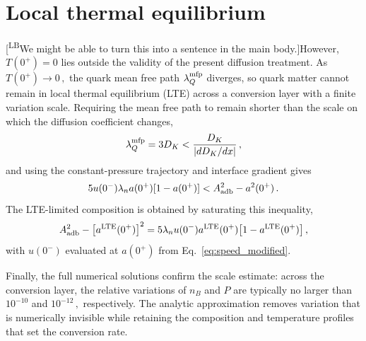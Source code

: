 \documentclass[10pt,superscriptaddress,
amsmath,aps,prc,twocolumn,nofootinbib,floatfix]{revtex4-1}
\newcommand{\mga}[1]{{\color[rgb]{0.6,0,0}#1}}
\newcommand{\LBcom}[1]{\textsf{\color{blue}[\textsuperscript{LB}#1]}}
\newcommand{\Bratio}{\lambda_n}
\begin{document}
\section{Local thermal equilibrium}
\label{sec:thermal-equilibrium}

\LBcom{We might be able to turn this into a sentence in the main body.}However, $T(0^+)=0$ lies outside the validity of the present diffusion treatment.
As $T(0^+)\to0\,,$ the quark mean free path $\lambda^{\rm mfp}_Q$ diverges, so quark matter cannot remain in local thermal equilibrium (LTE) across a conversion layer with a finite variation scale.
Requiring the mean free path to remain shorter than the scale on which the diffusion coefficient changes,
\begin{equation}
 \lambda^{\rm mfp}_Q=3D_K
 <
 \frac{D_K}{|dD_K/dx|}\,,
\label{eq:LTE_condition}
\end{equation}
and using the constant-pressure trajectory and interface gradient gives
\begin{equation}
 5u(0^-)\Bratio a(0^+)[1-a(0^+)]
 < A_{\rm adb}^2-a^2(0^+)\,.
\label{eq:LTE_inequality}
\end{equation}
The LTE-limited composition is obtained by saturating this inequality,
\begin{equation}
 A_{\rm adb}^2-\left[a^{\rm LTE}(0^+)\right]^2
 =
 5\Bratio u(0^-)a^{\rm LTE}(0^+)
 \bigl[1-a^{\rm LTE}(0^+)\bigr]\,,
\label{eq:LTE_cutoff}
\end{equation}
with $u(0^-)$ evaluated at $a(0^+)$ from
Eq.~\eqref{eq:speed_modified}.

Finally, the full numerical solutions confirm the scale estimate: across the conversion layer, the relative variations of $n_B$ and $P$ are typically no larger than $10^{-10}$ and $10^{-12}\,,$ respectively.  
The \mga{analytic} approximation removes variation that is numerically invisible while retaining the composition and temperature profiles that set the conversion rate.

\end{document}
